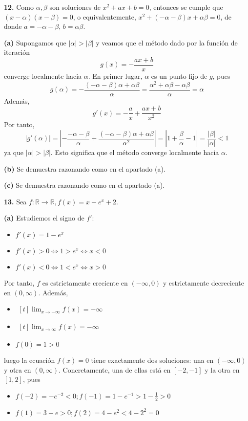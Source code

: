 \documentclass[12pt]{report}
\newcommand{\R}{\mathbb R}
\begin{document}
\vspace{6mm}
\textbf{12. } Como $\alpha, \beta$ son soluciones de $x^2+ax+b=0$, entonces se cumple que $(x-\alpha)(x-\beta)=0$, o equivalentemente, $x^2 +(-\alpha-\beta)x+\alpha\beta = 0$, de donde $a = -\alpha-\beta$, $b = \alpha\beta.$

\vspace{2mm}
\textbf{(a) } Supongamos que $|\alpha|>|\beta|$ y veamos que el método dado por la función de iteración
\[g(x) = -\frac{ax+b}{x}\]
converge localmente hacia $\alpha$. En primer lugar, $\alpha$ es un punto fijo de $g$, pues
\[g(\alpha)=-\frac{(-\alpha-\beta)\alpha+\alpha\beta}{\alpha} = \frac{\alpha^2+\alpha\beta-\alpha\beta}{\alpha} = \alpha\]
Además,
\[g'(x) = -\frac{a}{x}+\frac{ax+b}{x^2}\]
Por tanto,
\[|g'(\alpha)| = |-\frac{-\alpha-\beta}{\alpha} + \frac{(-\alpha-\beta)\alpha+\alpha\beta}{\alpha^2}| = |1 + \frac{\beta}{\alpha} -1| = \frac{|\beta|}{|\alpha|} < 1\]
ya que $|\alpha|>|\beta|$. Esto significa que el método converge localmente hacia $\alpha$.

\vspace{2mm}
\textbf{(b) } Se demuestra razonando como en el apartado (a).

\vspace{2mm}
\textbf{(c) } Se demuestra razonando como en el apartado (a).

\vspace{6mm}
\textbf{13. } Sea $f \colon \R \to \R, f(x) = x-e^x+2$.

\vspace{2mm}
\textbf{(a) } Estudiemos el signo de $f'$:
\begin{itemize}
    \item $f'(x) = 1 - e^x$
    \item $f'(x) > 0 \iff 1 > e^x \iff x < 0$
    \item $f'(x) < 0 \iff 1 < e^x \iff x > 0$
\end{itemize}
Por tanto, $f$ es estrictamente creciente en $(-\infty,0)$ y estrictamente decreciente en $(0,\infty)$. Además,
\begin{itemize}
    \item
    $
    \begin{aligned}[t]
        \lim_{x \to -\infty} f(x) = -\infty
    \end{aligned}
    $
    \item
    $
    \begin{aligned}[t]
        \lim_{x \to \infty} f(x) = -\infty
    \end{aligned}
    $
    \item $f(0)=1>0$
\end{itemize}
luego la ecuación $f(x)=0$ tiene exactamente dos soluciones: una en $(-\infty,0)$ y otra en $(0,\infty)$. Concretamente, una de ellas está en $[-2,-1]$ y la otra en $[1,2]$, pues
\begin{itemize}
    \item $f(-2) = -e^{-2} < 0; f(-1) = 1-e^{-1} > 1-\frac{1}{2}>0$
    \item $f(1) = 3 - e > 0; f(2) = 4-e^2<4-2^2=0$
\end{itemize}
\end{document}
